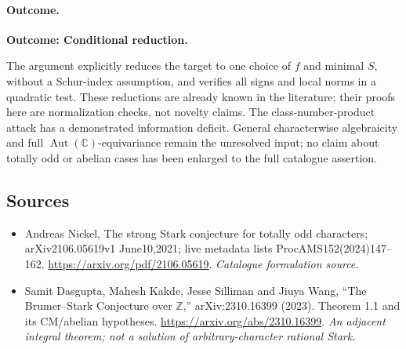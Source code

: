 \documentclass[11pt,a4paper]{article}
\newcommand{\Z}{\mathbb{Z}}
\newcommand{\C}{\mathbb{C}}
\numberwithin{equation}{section}
\begin{document}
\paragraph{Outcome.}
\textbf{Outcome: Conditional reduction.}

The argument explicitly reduces the target to one choice of $f$ and
minimal $S$, without a Schur-index assumption, and verifies all signs
and local norms in a quadratic test. These reductions are already
known in the literature; their proofs here are normalization checks,
not novelty claims. The class-number-product attack has a demonstrated
information deficit. General characterwise algebraicity and full
$\operatorname{Aut}(\C)$-equivariance remain the unresolved input; no
claim about totally odd or abelian cases has been enlarged to the full
catalogue assertion.
\subsection{Sources}
\begin{itemize}\raggedright
\item[\textnormal{[S1]}]\hypertarget{source:30006764:1}{} Andreas Nickel, The strong Stark conjecture for totally odd characters; arXiv2106.05619v1 June10,2021; live metadata lists ProcAMS152(2024)147–162.
\url{https://arxiv.org/pdf/2106.05619}.
{\small\textit{Catalogue formulation source.}}
\item[\textnormal{[E1]}]\hypertarget{extra:30006764:1}{} Samit Dasgupta, Mahesh Kakde, Jesse Silliman and Jiuya Wang, ``The Brumer--Stark Conjecture over $\Z$,'' arXiv:2310.16399 (2023). Theorem 1.1 and its CM/abelian hypotheses.
\url{https://arxiv.org/abs/2310.16399}.
{\small\textit{An adjacent integral theorem; not a solution of arbitrary-character rational Stark.}}
\end{itemize}
\end{document}

